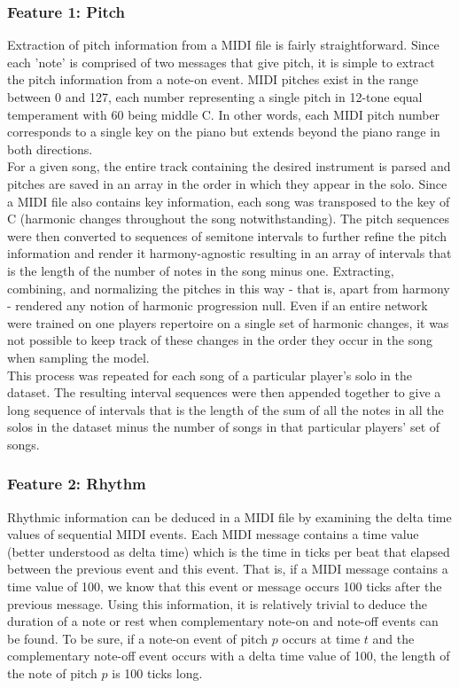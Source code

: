 \documentclass[conference]{IEEEtran}
\begin{document}
\subsubsection{Feature 1: Pitch} \label{f1pitch}
Extraction of pitch information from a MIDI file is fairly straightforward. Since each 'note' is comprised of two messages that give pitch, it is simple to extract the pitch information from a note-on event. MIDI pitches exist in the range between 0 and 127, each number representing a single pitch in 12-tone equal temperament with 60 being middle C. In other words, each MIDI pitch number corresponds to a single key on the piano but extends beyond the piano range in both directions.\\

For a given song, the entire track containing the desired instrument is parsed and pitches are saved in an array in the order in which they appear in the solo. Since a MIDI file also contains key information, each song was transposed to the key of C (harmonic changes throughout the song notwithstanding). The pitch sequences were then converted to sequences of semitone intervals to further refine the pitch information and render it harmony-agnostic resulting in an array of intervals that is the length of the number of notes in the song minus one. Extracting, combining, and normalizing the pitches in this way - that is, apart from harmony - rendered any notion of harmonic progression null. Even if an entire network were trained on one players repertoire on a single set of harmonic changes, it was not possible to keep track of these changes in the order they occur in the song when sampling the model.\\

This process was repeated for each song of a particular player's solo in the dataset. The resulting interval sequences were then appended together to give a long sequence of intervals that is the length of the sum of all the notes in all the solos in the dataset minus the number of songs in that particular players' set of songs.\\

\subsubsection{Feature 2: Rhythm} \label{f2rhythm}
Rhythmic information can be deduced in a MIDI file by examining the delta time values of sequential MIDI events. Each MIDI message contains a time value (better understood as delta time) which is the time in ticks per beat that elapsed between the previous event and this event. That is, if a MIDI message contains a time value of 100, we know that this event or message occurs 100 ticks after the previous message. Using this information, it is relatively trivial to deduce the duration of a note or rest when complementary note-on and note-off events can be found. To be sure, if a note-on event of pitch $p$ occurs at time $t$ and the complementary note-off event occurs with a delta time value of 100, the length of the note of pitch $p$ is 100 ticks long.\\
\end{document}
